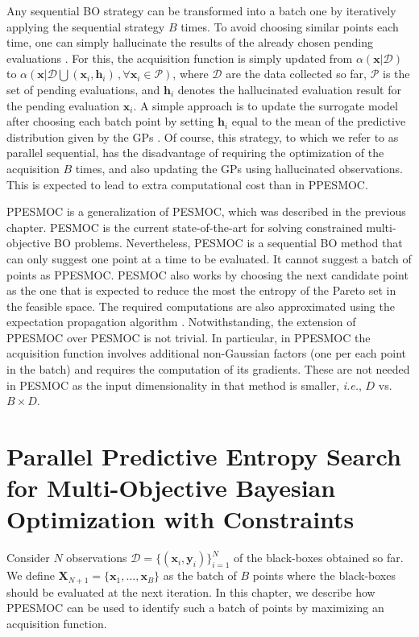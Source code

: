 Any sequential BO strategy can be transformed into a batch one by
iteratively applying the sequential strategy $B$ times.  
To avoid choosing similar points each time, one can simply 
hallucinate the results of the already chosen pending evaluations \citep{snoek2012practical}. 
For this, the acquisition function is simply 
updated from $\alpha(\mathbf{x}|\mathcal{D})$ to $\alpha(\mathbf{x}|\mathcal{D} 
\bigcup {(\mathbf{x}_i , \mathbf{h}_i)\,, \forall \mathbf{x}_i \in \mathcal{P}})$, 
where $\mathcal{D}$ are the data collected so far, $\mathcal{P}$ is the set of pending 
evaluations, and $\mathbf{h}_i$ denotes the hallucinated evaluation result for the 
pending evaluation $\mathbf{x}_i$. A simple approach is to update the surrogate model after choosing each 
batch point by setting $\mathbf{h}_i$ equal to the mean of the predictive distribution 
given by the GPs \citep{desautels2014parallelizing}. Of course, this strategy, to which we
refer to as parallel sequential, has the disadvantage of requiring the optimization of the
acquisition $B$ times, and also updating the GPs using hallucinated 
observations. This is expected to lead to extra computational cost than in PPESMOC.

PPESMOC is a generalization of PESMOC, which was described in the previous chapter. PESMOC is 
the current state-of-the-art for solving constrained multi-objective BO problems. 
Nevertheless, PESMOC is a sequential BO method that can only suggest one point at a time to 
be evaluated. It cannot suggest a batch of points as PPESMOC. PESMOC also works by choosing the 
next candidate point as the one that is expected to reduce the most the entropy of the Pareto set in the feasible 
space. The required computations are also approximated using the expectation propagation algorithm \citep{minka2001expectation}. 
Notwithstanding, the extension of PPESMOC over PESMOC is not trivial. In particular, in PPESMOC the 
acquisition function involves additional non-Gaussian factors (one per each point in the batch) and 
requires the computation of its gradients. These are not needed in PESMOC 
as the input dimensionality in that method is smaller, \emph{i.e.}, $D$ vs. $B \times D$.

\section{Parallel Predictive Entropy Search for Multi-Objective Bayesian Optimization with Constraints}

Consider $N$ observations $\mathcal{D}=\{ (\mathbf{x}_i,\mathbf{y}_i)\}_{i=1}^N$
of the black-boxes obtained so far. We define $\mathbf{X}_{N+1}=\{\mathbf{x}_1,\ldots,\mathbf{x}_B\}$ as the 
batch of $B$ points where the black-boxes should be evaluated at the next iteration. In this chapter, we describe
how PPESMOC can be used to identify such a batch of points by maximizing an acquisition function.

